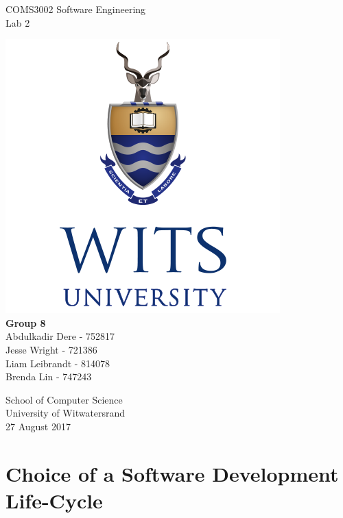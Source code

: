 \documentclass{article}
\begin{document}
\begin{titlepage}
    \begin{center}
        \vspace*{1cm}
        \huge COMS3002 Software Engineering \\
        \LARGE Lab 2
        
		\vspace{1.5cm}        
		
		\includegraphics[scale=0.5]{witsLogo.png} \\		
		\vspace{1.5cm}
        \textbf{Group 8} \\
        \large Abdulkadir Dere - 752817\\
        Jesse Wright - 721386 \\
        Liam Leibrandt - 814078\\
        Brenda Lin - 747243 \\
        
		\vspace{1.5cm} 
		       
                
        School of Computer Science\\
        University of Witwatersrand\\
        27 August 2017
        
    \end{center}
\end{titlepage}

\section*{Choice of a Software Development Life-Cycle}
\end{document}
